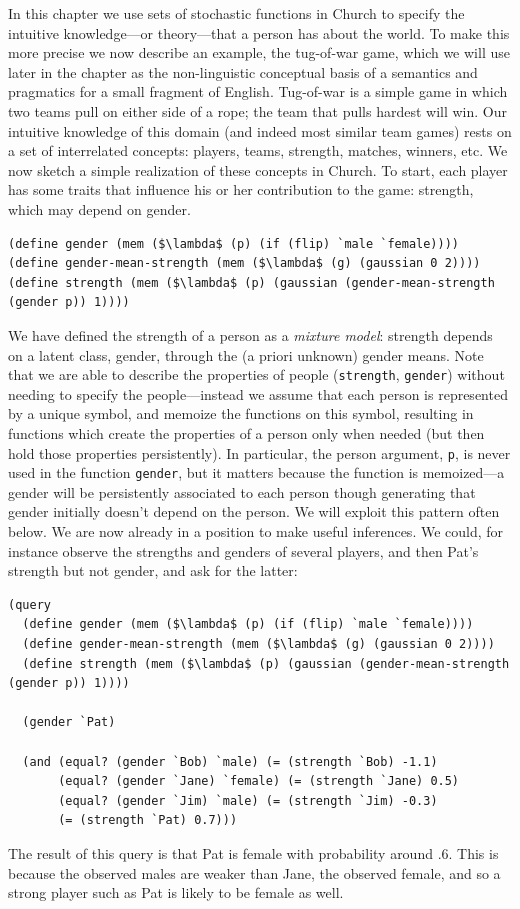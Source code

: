 \documentclass[pdfextras]{handbook}
\begin{document}
In this chapter we use sets of stochastic functions in Church to specify the intuitive knowledge---or theory---that a person has about the world. 
To make this more precise we now describe an example, the tug-of-war game, which we will use later in the chapter as the non-linguistic conceptual basis of a semantics and pragmatics for a small fragment of English. 
Tug-of-war is a simple game in which two teams pull on either side of a rope; the team that pulls hardest will win. 
Our intuitive knowledge of this domain (and indeed most similar team games) rests on a set of interrelated concepts: players, teams, strength, matches, winners, etc. 
We now sketch a simple realization of these concepts in Church. 
To start, each player has some traits that influence his or her contribution to the game: strength, which may depend on gender.
\begin{lstlisting}[mathescape]
(define gender (mem ($\lambda$ (p) (if (flip) `male `female))))
(define gender-mean-strength (mem ($\lambda$ (g) (gaussian 0 2))))
(define strength (mem ($\lambda$ (p) (gaussian (gender-mean-strength (gender p)) 1))))
\end{lstlisting}
We have defined the strength of a person as a \emph{mixture model}: strength depends on a latent class, gender, through the (a priori unknown) gender means. 
Note that we are able to describe the properties of people (\lstinline{strength}, \lstinline{gender}) without needing to specify the people---instead we assume that each person is represented by a unique symbol, and memoize the functions on this symbol, resulting in functions which create the properties of a person only when needed (but then hold those properties persistently). 
In particular, the person argument, \lstinline{p}, is never used in the function \lstinline{gender}, but it matters because the function is memoized---a gender will be persistently associated to each person though generating that gender initially doesn't depend on the person. 
We will exploit this pattern often below.
We are now already in a position to make useful inferences. 
We could, for instance observe the strengths and genders of several players, and then Pat's strength but not gender, and ask for the latter:
\begin{lstlisting}[mathescape]
(query
  (define gender (mem ($\lambda$ (p) (if (flip) `male `female))))
  (define gender-mean-strength (mem ($\lambda$ (g) (gaussian 0 2))))
  (define strength (mem ($\lambda$ (p) (gaussian (gender-mean-strength (gender p)) 1))))
  
  (gender `Pat)
  
  (and (equal? (gender `Bob) `male) (= (strength `Bob) -1.1)
       (equal? (gender `Jane) `female) (= (strength `Jane) 0.5)
       (equal? (gender `Jim) `male) (= (strength `Jim) -0.3)
       (= (strength `Pat) 0.7)))
\end{lstlisting}
The result of this query is that Pat is female with probability around .6. 
This is because the observed males are weaker than Jane, the observed female, and so a strong player such as Pat is likely to be female as well.
\end{document}
